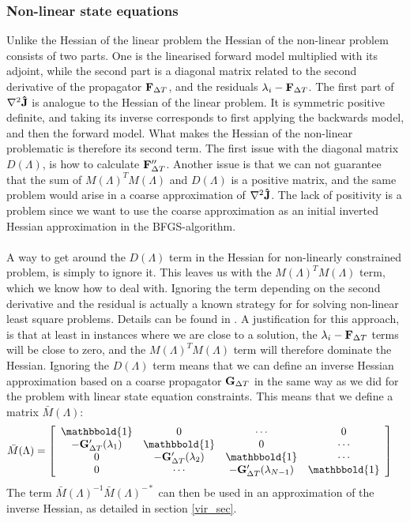 \subsubsection{Non-linear state equations}
Unlike the Hessian of the linear problem the Hessian of the non-linear problem consists of two parts. One is the linearised forward model multiplied with its adjoint, while the second part is a diagonal matrix related to the second derivative of the propagator $\bold F_{\Delta T}$, and the residuals $\lambda_i-\bold F_{\Delta T}$. The first part of $\nabla^2 \bold{\hat{J}}$ is analogue to the Hessian of the linear problem. It is symmetric positive definite, and taking its inverse corresponds to first applying the backwards model, and then the forward model. What makes the Hessian of the non-linear problematic is therefore its second term. The first issue with the diagonal matrix $D(\Lambda)$, is how to calculate $\bold F_{\Delta T}''$. Another issue is that we can not guarantee that the sum of $M(\Lambda)^TM(\Lambda)$ and $D(\Lambda)$ is a positive matrix, and the same problem would arise in a coarse approximation of $\nabla^2 \bold{\hat{J}}$. The lack of positivity is a problem since we want to use the coarse approximation as an initial inverted Hessian approximation in the BFGS-algorithm.
\\
\\
A way to get around the $D(\Lambda)$ term in the Hessian for non-linearly constrained problem, is simply to ignore it. This leaves us with the $M(\Lambda)^TM(\Lambda)$ term, which we know how to deal with. Ignoring the term depending on the second derivative and the residual is actually a known strategy for for solving non-linear least square problems. Details can be found in \cite{nocedal2006numerical}. A justification for this approach, is that at least in instances where we are close to a solution, the $\lambda_i-\bold F_{\Delta T}$ terms will be close to zero, and the $M(\Lambda)^TM(\Lambda)$ term will therefore dominate the Hessian. Ignoring the $D(\Lambda)$ term means that we can define an inverse Hessian approximation based on a coarse propagator $\bold G_{\Delta T}$ in the same way as we did for the problem with linear state equation constraints. This means that we define a matrix $\bar M(\Lambda)$:
\begin{align}
\bar M(\Lambda) &= \left[ \begin{array}{cccc}
   \mathbbold{1} & 0 & \cdots & 0 \\  
   -\bold{G}_{\Delta T}'(\lambda_{1}) & \mathbbold{1} & 0 & \cdots \\ 
   0 &-\bold{G}_{\Delta T}'(\lambda_{2}) & \mathbbold{1}  & \cdots \\
   0 &\cdots &-\bold{G}_{\Delta T}'(\lambda_{N-1}) & \mathbbold{1}  \\
   \end{array}  \right] \label{ppc_linearized}
\end{align}
The term $\bar{M}(\Lambda)^{-1}\bar{M}(\Lambda)^{-*}$ can then be used in an approximation of the inverse Hessian, as detailed in section \ref{vir_sec}.
